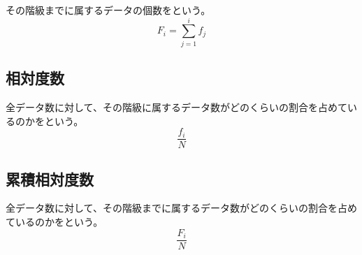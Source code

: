 \documentclass[../../../topic_statistics]{subfiles}
\begin{document}
その階級までに属するデータの個数をという。
\begin{equation*}
  F_i = \sum_{j=1}^{i} f_j
\end{equation*}

\subsection{相対度数}

全データ数に対して、その階級に属するデータ数がどのくらいの割合を占めているのかをという。
\begin{equation*}
  \frac{f_i}{N}
\end{equation*}

\subsection{累積相対度数}

全データ数に対して、その階級までに属するデータ数がどのくらいの割合を占めているのかをという。
\begin{equation*}
  \frac{F_i}{N}
\end{equation*}
\end{document}
